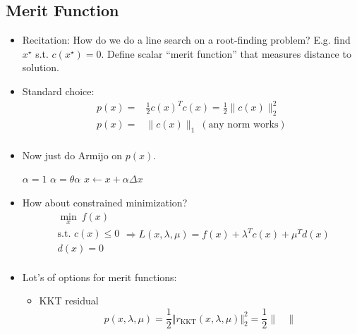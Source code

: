 \subsection{Merit Function}
\begin{itemize}
    \item Recitation: How do we do a line search on a root-finding problem? E.g. find $x^\star$ s.t. $c(x^\star)=0$. Define scalar ``merit function'' that measures distance to solution.
    \item Standard choice:
    \begin{equation}
        \begin{aligned}
            p\left( x \right) =&\frac{1}{2}c\left( x \right) ^Tc\left( x \right) =\frac{1}{2}\lVert c\left( x \right) \rVert _{2}^{2}\\
            p\left( x \right) =&\lVert c\left( x \right) \rVert _1\ \left( \text{any\ norm\ works} \right)\\
        \end{aligned}
    \end{equation}
    \item Now just do Armijo on $p(x)$.
    \begin{algorithmic}[1]
        \STATE $\alpha = 1$
          \STATE $\alpha = \theta\alpha$
        \ENDWHILE
        \STATE $x\gets x+\alpha\Delta x$
    \end{algorithmic}
    \item How about constrained minimization?
    \begin{equation}
        \begin{aligned}
            \min _x\ f\left( x \right)\\
            \text{s.t.\ }c\left( x \right) \le 0\\
            d\left( x \right) =0\\
        \end{aligned}\Rightarrow L\left( x,\lambda ,\mu \right) =f\left( x \right) +\lambda ^Tc\left( x \right) +\mu ^Td\left( x \right) 
    \end{equation}
    \item Lot's of options for merit functions:
    \begin{itemize}
        \item KKT residual
        \begin{equation}
            p(x,\lambda,\mu)=\frac{1}{2}\Vert r_{\text{KKT}}\left(x,\lambda,\mu\right)\Vert_2^2=\frac{1}{2} \begin{Vmatrix}

\end{Vmatrix}
\end{equation}
\end{itemize}
\end{itemize}
